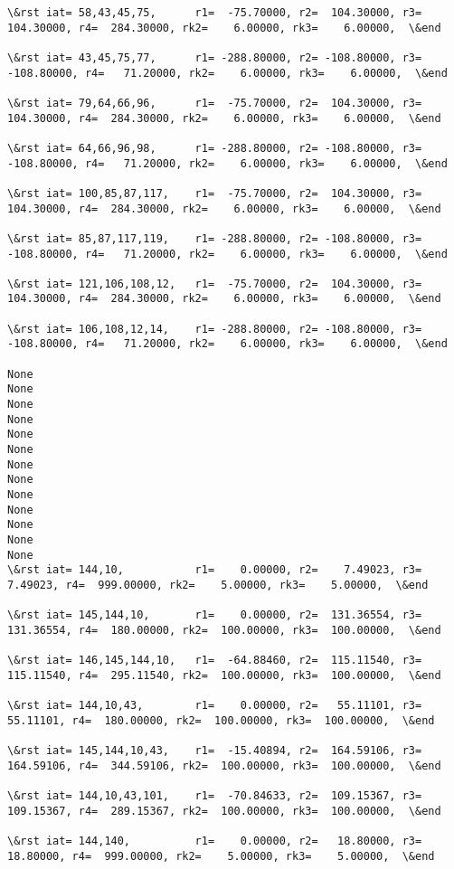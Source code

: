 \documentclass[11pt]{article}
\begin{document}
\begin{Verbatim}[commandchars=\\\{\}]
\&rst iat= 58,43,45,75,      r1=  -75.70000, r2=  104.30000, r3=  104.30000, r4=  284.30000, rk2=    6.00000, rk3=    6.00000,  \&end

\&rst iat= 43,45,75,77,      r1= -288.80000, r2= -108.80000, r3= -108.80000, r4=   71.20000, rk2=    6.00000, rk3=    6.00000,  \&end

\&rst iat= 79,64,66,96,      r1=  -75.70000, r2=  104.30000, r3=  104.30000, r4=  284.30000, rk2=    6.00000, rk3=    6.00000,  \&end

\&rst iat= 64,66,96,98,      r1= -288.80000, r2= -108.80000, r3= -108.80000, r4=   71.20000, rk2=    6.00000, rk3=    6.00000,  \&end

\&rst iat= 100,85,87,117,    r1=  -75.70000, r2=  104.30000, r3=  104.30000, r4=  284.30000, rk2=    6.00000, rk3=    6.00000,  \&end

\&rst iat= 85,87,117,119,    r1= -288.80000, r2= -108.80000, r3= -108.80000, r4=   71.20000, rk2=    6.00000, rk3=    6.00000,  \&end

\&rst iat= 121,106,108,12,   r1=  -75.70000, r2=  104.30000, r3=  104.30000, r4=  284.30000, rk2=    6.00000, rk3=    6.00000,  \&end

\&rst iat= 106,108,12,14,    r1= -288.80000, r2= -108.80000, r3= -108.80000, r4=   71.20000, rk2=    6.00000, rk3=    6.00000,  \&end

None
None
None
None
None
None
None
None
None
None
None
None
None
\&rst iat= 144,10,           r1=    0.00000, r2=    7.49023, r3=    7.49023, r4=  999.00000, rk2=    5.00000, rk3=    5.00000,  \&end

\&rst iat= 145,144,10,       r1=    0.00000, r2=  131.36554, r3=  131.36554, r4=  180.00000, rk2=  100.00000, rk3=  100.00000,  \&end

\&rst iat= 146,145,144,10,   r1=  -64.88460, r2=  115.11540, r3=  115.11540, r4=  295.11540, rk2=  100.00000, rk3=  100.00000,  \&end

\&rst iat= 144,10,43,        r1=    0.00000, r2=   55.11101, r3=   55.11101, r4=  180.00000, rk2=  100.00000, rk3=  100.00000,  \&end

\&rst iat= 145,144,10,43,    r1=  -15.40894, r2=  164.59106, r3=  164.59106, r4=  344.59106, rk2=  100.00000, rk3=  100.00000,  \&end

\&rst iat= 144,10,43,101,    r1=  -70.84633, r2=  109.15367, r3=  109.15367, r4=  289.15367, rk2=  100.00000, rk3=  100.00000,  \&end

\&rst iat= 144,140,          r1=    0.00000, r2=   18.80000, r3=   18.80000, r4=  999.00000, rk2=    5.00000, rk3=    5.00000,  \&end


\end{Verbatim}
\end{document}
